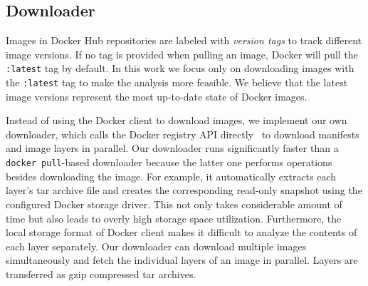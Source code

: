 \subsection{Downloader}
\label{sec:downloader}

Images in Docker Hub repositories are labeled with \emph{version tags}
to track different image versions.
%
%
If no tag is provided when pulling an image, 
Docker will pull the \texttt{:latest} tag by default.
%
In this work we focus only on downloading images with the \texttt{:latest} tag to
make the analysis more feasible. We believe that the latest
image versions represent the most up-to-date state of Docker images.
%

Instead of using the Docker client to download images,
we implement our own downloader, which calls the Docker registry API
directly~\cite{dockerregistryclient} to download manifests
and image layers in parallel.
%
Our downloader runs significantly faster than a \texttt{docker pull}-based downloader
because the latter one performs operations besides downloading the image.
For example, it automatically extracts each layer's tar archive file
and creates the corresponding read-only snapshot using the configured
Docker storage driver.
This not only takes considerable amount of time but also leads
to overly high storage space utilization.
%
Furthermore, the local storage format of Docker client makes it difficult
to analyze the contents of each layer separately.
%
Our downloader can download multiple images simultaneously and fetch
the individual layers of an image in parallel. Layers are transferred as gzip
compressed tar archives.

%
%


